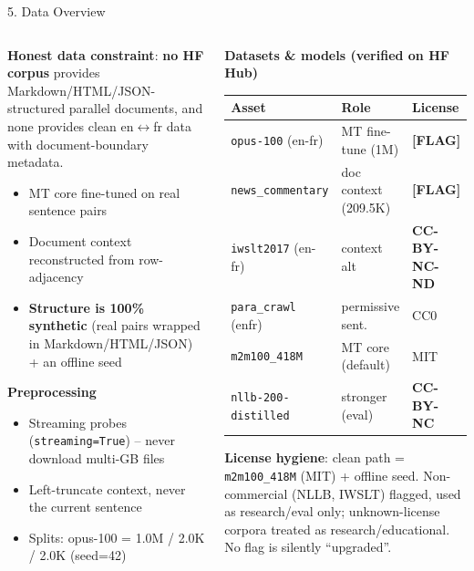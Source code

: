 \documentclass[10pt,aspectratio=169]{beamer}
\begin{document}
\begin{frame}{5. Data Overview}
\begin{columns}[T]
\begin{column}{0.52\textwidth}
\textbf{Honest data constraint}: \textbf{no HF corpus} provides Markdown/HTML/JSON-structured parallel documents, and none provides clean en$\leftrightarrow$fr data with document-boundary metadata.
\begin{itemize}\small
  \item MT core fine-tuned on real sentence pairs
  \item Document context reconstructed from row-adjacency
  \item \textbf{Structure is 100\% synthetic} (real pairs wrapped in Markdown/HTML/JSON) + an offline seed
\end{itemize}

\textbf{Preprocessing}
\begin{itemize}\small
  \item Streaming probes (\texttt{streaming=True}) -- never download multi-GB files
  \item Left-truncate context, never the current sentence
  \item Splits: opus-100 = 1.0M / 2.0K / 2.0K (seed=42)
\end{itemize}
\end{column}
\begin{column}{0.48\textwidth}
\textbf{Datasets \& models (verified on HF Hub)}
\begin{table}[h]
\centering\scriptsize
\begin{tabular}{lll}
\toprule
\textbf{Asset} & \textbf{Role} & \textbf{License} \\
\midrule
\texttt{opus-100} (en-fr)        & MT fine-tune (1M) & \textbf{[FLAG]} \\
\texttt{news\_commentary}         & doc context (209.5K) & \textbf{[FLAG]} \\
\texttt{iwslt2017} (en-fr)       & context alt & \textbf{CC-BY-NC-ND} \\
\texttt{para\_crawl} (enfr)       & permissive sent. & CC0 \\
\texttt{m2m100\_418M}             & MT core (default) & MIT \\
\texttt{nllb-200-distilled}      & stronger (eval) & \textbf{CC-BY-NC} \\
\bottomrule
\end{tabular}
\end{table}
\scriptsize \textbf{License hygiene}: clean path = \texttt{m2m100\_418M} (MIT) + offline seed. Non-commercial (NLLB, IWSLT) flagged, used as research/eval only; unknown-license corpora treated as research/educational. No flag is silently ``upgraded''.
\end{column}
\end{columns}
\end{frame}
\end{document}
